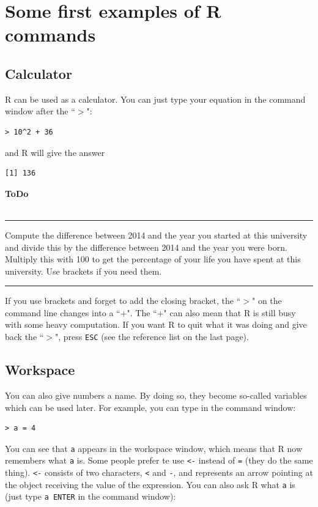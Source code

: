 \documentclass[a4paper,11pt,twocolumn,tablecaptionabove]{scrartcl} %
\makeatletter
\newenvironment{ToDo} {%
  \begin{flushright}
    \hfill
    \begin{minipage}{0.95\columnwidth}         %
    \textsf{\textbf{ToDo}} \\
      \vspace{-0.85cm}\\
      {\color{Gray}\rule[-0.1cm]{\columnwidth}{1.5pt}}} { %
      {\color{Gray} \rule[0.3cm]{\columnwidth}{1.5pt}}
    \end{minipage}
    \vspace{1em}
  \end{flushright}
  }
\let\SF@@footnote\footnote
\def\footnote{\ifx\protect\@typeset@protect
 \expandafter\SF@@footnote
 \else
 \expandafter\SF@gobble@opt
 \fi
}
\edef\SF@gobble@opt{\noexpand\protect
 \expandafter\noexpand\csname SF@gobble@opt \endcsname}
\makeatother
\begin{document}
\section{Some first examples of R commands}

\subsection{Calculator}

R can be used as a calculator. You can just type your equation in the command window after the ``$>$":
\begin{Verbatim}[frame=single,gobble=0]
> 10^2 + 36
\end{Verbatim}
and R will give the answer
\begin{Verbatim}[frame=single,gobble=0]
[1] 136
\end{Verbatim}

\begin{ToDo}
Compute the difference between 2014 and the year you started at this university and divide this by the difference between 2014 and the year you were born. Multiply this with 100 to get the percentage of your life you have spent at this university. Use brackets if you need them. \\
\end{ToDo}

If you use brackets and forget to add the closing bracket, the ``$>$" on the command line changes into a ``+". The ``+" can also mean that R is still busy with some  heavy computation. If you want R to quit what it was doing and give back the ``$>$", press \texttt{ESC} (see the reference list on the last page). 

\subsection{Workspace}

You can also give numbers a name. By doing so, they become so-called variables which can be used later. For example, you can type in the command window: 
\begin{Verbatim}[frame=single,gobble=0]
> a = 4
\end{Verbatim}
You can see that \texttt{a} appears in the workspace window, which means that R now remembers what \texttt{a} is.\footnote{Some people prefer te use \texttt{<-} instead of \texttt{=} (they do the same thing). \texttt{<-} consists of two characters, \texttt{<} and \texttt{-}, and represents an arrow pointing at the object receiving the value of the expression.} You can also ask R what \texttt{a} is (just type \texttt{a ENTER} in the command window):
\end{document}
